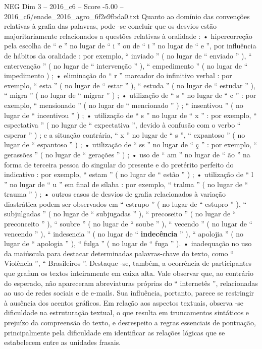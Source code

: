 \begin{textsample}{NEG Dim 3 – 2016\_c6 – Score -5.00 – 2016\_c6/enade\_2016\_agro\_6f2e9fbda0.txt}
Quanto ao domínio das convenções relativas à grafia das palavras, pode -se concluir que os desvios estão majoritariamente relacionados a questões relativas à oralidade : • hipercorreção pela escolha de “ e ” no lugar de “ i ” ou de “ i ” no lugar de “ e ”, por influência de hábitos da oralidade : por exemplo, “ inviado ” ( no lugar de “ enviado ” ), “ entervenção ” ( no lugar de “ intervenção ” ), “ empedimento ” ( no lugar de “ impedimento ) ; • eliminação do “ r ” marcador do infinitivo verbal : por exemplo, “ esta ” ( no lugar de “ estar ” ), “ estuda ” ( no lugar de “ estudar ” ), “ migra ” ( no lugar de “ migrar ” ) ; • utilização de “ s ” no lugar de “ c ” : por exemplo, “ mensionado ” ( no lugar de “ mencionado ” ) ; “ insentivou ” ( no lugar de “ incentivou ” ) ; • utilização de “ s ” no lugar de “ x ” : por exemplo, “ espectativa ” ( no lugar de “ expectativa ”, devido à confusão com o verbo “ esperar ” ) ; e a situação contrária, “ x ” no lugar de “ s ”, “ expantoso ” ( no lugar de “ espantoso ” ) ; • utilização de “ ss ” no lugar de “ ç ” : por exemplo, “ gerassões ” ( no lugar de “ gerações ” ) ; • uso de “ am ” no lugar de “ ão ” na forma de terceira pessoa do singular do presente e do pretérito perfeito do indicativo : por exemplo, “ estam ” ( no lugar de “ estão ” ) ; • utilização de “ l ” no lugar de “ u ” em final de sílaba : por exemplo, “ tralma ” ( no lugar de “ trauma ” ) ; • outros casos de desvios de grafia relacionados à variação diastrática podem ser observados em “ estrupo ” ( no lugar de “ estupro ” ), “ subjulgadas ” ( no lugar de “ subjugadas ” ), “ precoseito ” ( no lugar de “ preconceito ” ), “ soubre ” ( no lugar de “ soube ” ), “ vecendo ” ( no lugar de “ vencendo ” ), “ indesencia ” ( no lugar de “ \textbf{indecência} ” ), “ apolojia ” ( no lugar de “ apologia ” ), “ fulga ” ( no lugar de “ fuga ” ). • inadequação no uso da maiúscula para destacar determinadas palavras-chave do texto, como “ Violência ”, “ Brasileiros ”.
Destaque -se, também, a ocorrência de participantes que grafam os textos inteiramente em caixa alta.
Vale observar que, ao contrário do esperado, não apareceram abreviaturas próprias do “ internetês ”, relacionadas ao uso de redes sociais e de e-mails.
Sua influência, portanto, parece se restringir à ausência dos acentos gráficos.
Em relação aos aspectos textuais, observa -se dificuldade na estruturação textual, o que resulta em truncamentos sintáticos e prejuízo da compreensão do texto, e desrespeito a regras essenciais de pontuação, principalmente pela dificuldade em identificar as relações lógicas que se estabelecem entre as unidades frasais.

\end{textsample}
